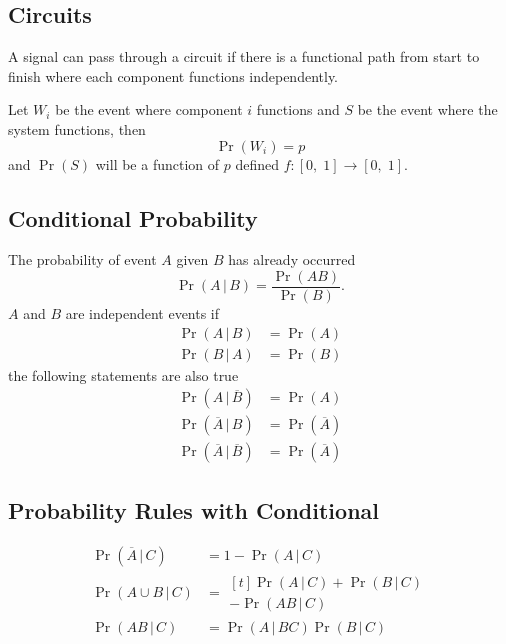 \documentclass{article}
\begin{document}
\begin{multicols}{3}
    \subsection{Circuits}
    A signal can pass through a circuit if there is a functional path from start to finish where
    each component functions independently.

    Let \(W_i\) be the event where component \(i\) functions 
    and \(S\) be the event where the system functions, then
    \begin{equation*}
        \Pr{\left( W_i \right)} = p
    \end{equation*}
    and \(\Pr{\left( S \right)}\) will be a function of \(p\) defined \(f:\left[ 0,\; 1 \right] \to \left[ 0,\; 1 \right]\).
    \subsection{Conditional Probability}
    The probability of event \(A\) given \(B\) has already occurred
    \begin{equation*}
        \Pr{\left( A \,\vert\, B \right)} = \frac{\Pr{\left( A B \right)}}{\Pr{\left( B \right)}}.
    \end{equation*}
    \(A\) and \(B\) are independent events if
    \begin{align*}
        \Pr{\left( A \,\vert\, B \right)} & = \Pr{\left( A \right)} \\
        \Pr{\left( B \,\vert\, A \right)} & = \Pr{\left( B \right)}
    \end{align*}
    the following statements are also true
    \begin{align*}
        \Pr{\left( A \,\vert\, \overline{B} \right)}            & = \Pr{\left( A \right)}            \\
        \Pr{\left( \overline{A} \,\vert\, B \right)}            & = \Pr{\left( \overline{A} \right)} \\
        \Pr{\left( \overline{A} \,\vert\, \overline{B} \right)} & = \Pr{\left( \overline{A} \right)}
    \end{align*}
    \subsection{Probability Rules with Conditional}
    \begin{align*}
        \Pr{\left( \overline{A} \,\vert\, C \right)} & = 1 - \Pr{\left( A \,\vert\, C \right)}                                 \\
        \Pr{\left( A \cup B \,\vert\, C \right)}     & = \begin{aligned}[t]
                                                             \Pr{\left( A \,\vert\, C \right)} + \Pr{\left( B \,\vert\, C \right)} \\
                                                             - \Pr{\left( AB \,\vert\, C \right)}
                                                         \end{aligned} \\
        \Pr{\left( A B \,\vert\, C \right)}          & = \Pr{\left( A \,\vert\, BC \right)} \Pr{\left( B \,\vert\, C \right)}
    \end{align*}

\end{multicols}
\end{document}
